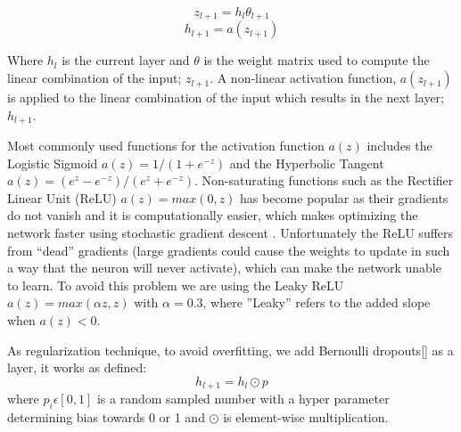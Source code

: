 \documentclass{article}
\begin{document}
\begin{equation} \label{eq:1}
z_{l+1} = h_l \theta_{l+1}
\end{equation}
\begin{equation} \label{eq:2}
h_{l+1} = a(z_{l+1})
\end{equation}

Where $h_l$ is the current layer and $\theta$ is the weight matrix used to compute the linear combination of the input; $z_{l+1}$. A non-linear activation function, $a(z_{l+1})$ is applied to the linear combination of the input which results in the next layer; $h_{l+1}$.

Most commonly used functions for the activation function $a(z)$ includes the Logistic Sigmoid $a(z)=1/(1+e^{-z})$ and the Hyperbolic Tangent $a(z)=(e^z-e^{-z})/(e^z+e^{-z})$. Non-saturating functions such as the Rectifier Linear Unit (ReLU) $a(z) = max(0,z)$ has become popular as their gradients do not vanish and it is computationally easier, which makes optimizing the network faster using stochastic gradient descent \cite{NIPS2012_4824}. Unfortunately the ReLU suffers from ``dead'' gradients (large gradients could cause the weights to update in such a way that the neuron will never activate), which can make the network unable to learn. To avoid this problem we are using the Leaky ReLU $a(z) = max(\alpha z, z)$ with $\alpha=0.3$\cite{DBLP:journals/corr/HeZR015}, where ''Leaky'' refers to the added slope when $a(z)<0$.

As regularization technique, to avoid overfitting, we add Bernoulli dropouts\ref{} as a layer, it works as defined:
\begin{equation} \label{eq:2}
h_{l+1} = h_l \odot p
\end{equation}
where $p_i \epsilon [0, 1]$ is a random sampled number with a hyper parameter determining bias towards 0 or 1 and $\odot$ is element-wise multiplication.
\end{document}
